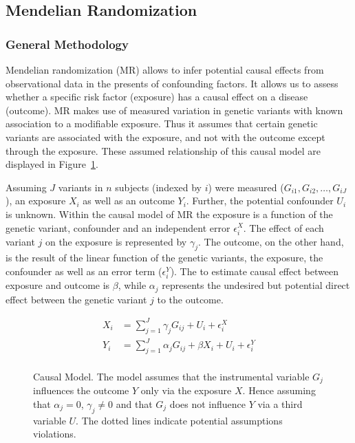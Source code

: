 \subsection{Mendelian Randomization}
\label{sub:joint_association_study}

\subsubsection{General Methodology}
\label{ssub:General_Methedology}

Mendelian randomization (MR) allows to infer potential causal effects from observational data in the presents of confounding factors. 
It allows us to assess whether a specific risk factor (exposure) has a causal effect on a disease (outcome).
MR makes use of measured variation in genetic variants with known association to a modifiable exposure.
Thus it assumes that certain genetic variants are associated with the exposure, and not with the outcome except through the exposure.
These assumed relationship of this causal model are displayed in Figure~\ref{fig:causal}.

Assuming $J$ variants in $n$ subjects (indexed by $i$) were measured ($G_{i1}, G_{i2}, \ldots , G_{iJ}$),
an exposure $X_i$ as well as an outcome $Y_i$.
Further, the potential confounder $U_i$ is unknown. 
Within the causal model of MR the exposure is a function of the genetic variant, confounder and an independent error $\epsilon_i^X$. 
The effect of each variant $j$ on the exposure is represented by $\gamma_j$.
The outcome, on the other hand, is the result of the linear function of the genetic variants, the exposure, the confounder as well as an error term ($\epsilon_i^Y$).
The to estimate causal effect between exposure and outcome is $\beta$, while $\alpha_j$ represents the undesired but potential direct effect between the genetic variant $j$ to the outcome.

\begin{equation} \label{eq:rm_basic}
  \begin{split}
    X_i &= \sum^J_{j=1} \gamma_jG_{ij} + U_i + \epsilon_i^X \\
    Y_i &= \sum^J_{j=1} \alpha_jG_{ij} + \beta X_i + U_i + \epsilon_i^Y \\
  \end{split}
\end{equation}

\begin{figure}[!h]
  \centering
  \resizebox{0.5\textwidth}{!}{}
  \caption{Causal Model.
    The model assumes that the instrumental variable $G_j$ influences the outcome $Y$ only via the exposure $X$.
    Hence assuming that $\alpha_j=0$, $\gamma_j\neq0$ and that $G_j$ does not influence $Y$ via a third variable $U$. 
    The dotted lines indicate potential assumptions violations.
  }\label{fig:causal}
\end{figure}


